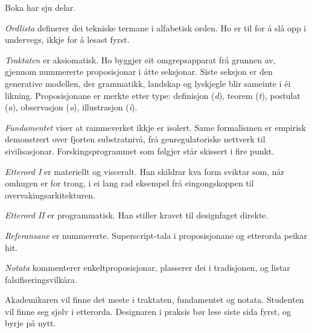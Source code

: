 \begin{widebody}
\begin{foreordbody}

Boka har sju delar.

\textit{Ordlista} definerer dei tekniske termane i alfabetisk orden. Ho er til for å slå opp i undervegs, ikkje for å lesast fyrst.

\textit{Traktaten} er aksiomatisk. Ho byggjer eit omgrepsapparat frå grunnen av, gjennom nummererte proposisjonar i åtte seksjonar. Siste seksjon er den generative modellen, der grammatikk, landskap og lyskjegle blir sameinte i éi likning. Proposisjonane er merkte etter type: definisjon (\textit{d}), teorem (\textit{t}), postulat (\textit{a}), observasjon (\textit{o}), illustrasjon (\textit{i}).

\textit{Fundamentet} viser at rammeverket ikkje er isolert. Same formalismen er empirisk demonstrert over fjorten substratnivå, frå genregulatoriske nettverk til sivilisasjonar. Forskingsprogrammet som følgjer står skissert i fire punkt.

\textit{Etterord I} er materiellt og visceralt. Han skildrar kva form sviktar som, når omhugen er for trong, i ei lang rad eksempel frå eingongskoppen til overvakingsarkitekturen.

\textit{Etterord II} er programmatisk. Han stiller kravet til designfaget direkte.

\textit{Referansane} er nummererte. Superscript-tala i proposisjonane og etterorda peikar hit.

\textit{Notata} kommenterer enkeltproposisjonar, plasserer dei i tradisjonen, og listar falsifiseringsvilkåra.

Akademikaren vil finne det meste i traktaten, fundamentet og notata. Studenten vil finne seg sjølv i etterorda. Designaren i praksis bør lese siste sida fyrst, og byrje på nytt.

\end{foreordbody}
\end{widebody}
